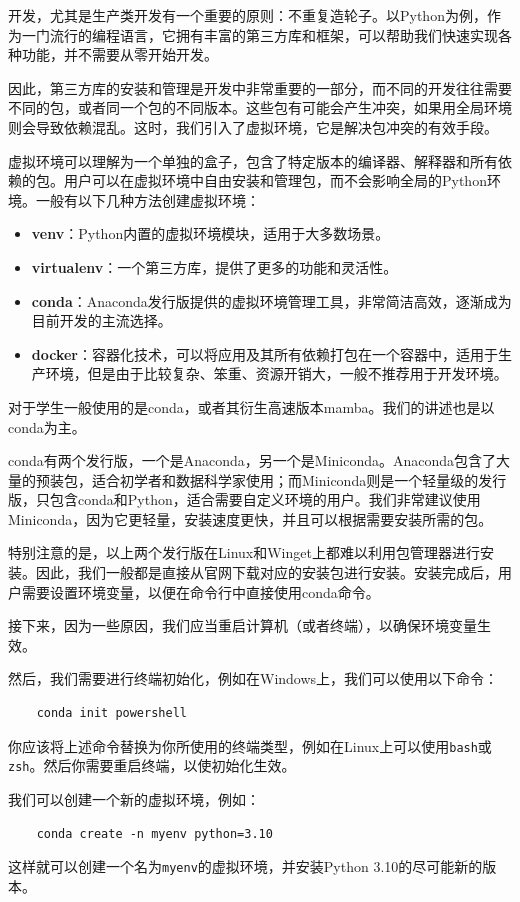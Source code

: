 \documentclass[../main.tex]{subfiles}
\begin{document}
开发，尤其是生产类开发有一个重要的原则：不重复造轮子。以Python为例，作为一门流行的编程语言，它拥有丰富的第三方库和框架，可以帮助我们快速实现各种功能，并不需要从零开始开发。

因此，第三方库的安装和管理是开发中非常重要的一部分，而不同的开发往往需要不同的包，或者同一个包的不同版本。这些包有可能会产生冲突，如果用全局环境则会导致依赖混乱。这时，我们引入了虚拟环境，它是解决包冲突的有效手段。

虚拟环境可以理解为一个单独的盒子，包含了特定版本的编译器、解释器和所有依赖的包。用户可以在虚拟环境中自由安装和管理包，而不会影响全局的Python环境。一般有以下几种方法创建虚拟环境：
\begin{itemize}
  \item \textbf{venv}：Python内置的虚拟环境模块，适用于大多数场景。
  \item \textbf{virtualenv}：一个第三方库，提供了更多的功能和灵活性。
  \item \textbf{conda}：Anaconda发行版提供的虚拟环境管理工具，非常简洁高效，逐渐成为目前开发的主流选择。
  \item \textbf{docker}：容器化技术，可以将应用及其所有依赖打包在一个容器中，适用于生产环境，但是由于比较复杂、笨重、资源开销大，一般不推荐用于开发环境。
\end{itemize}

对于学生一般使用的是conda，或者其衍生高速版本mamba。我们的讲述也是以conda为主。

conda有两个发行版，一个是Anaconda，另一个是Miniconda。Anaconda包含了大量的预装包，适合初学者和数据科学家使用；而Miniconda则是一个轻量级的发行版，只包含conda和Python，适合需要自定义环境的用户。我们非常建议使用Miniconda，因为它更轻量，安装速度更快，并且可以根据需要安装所需的包。

特别注意的是，以上两个发行版在Linux和Winget上都难以利用包管理器进行安装。因此，我们一般都是直接从官网下载对应的安装包进行安装。安装完成后，用户需要设置环境变量，以便在命令行中直接使用conda命令。

接下来，因为一些原因，我们应当重启计算机（或者终端），以确保环境变量生效。

然后，我们需要进行终端初始化，例如在Windows上，我们可以使用以下命令：
\begin{verbatim}
    conda init powershell
\end{verbatim}

你应该将上述命令替换为你所使用的终端类型，例如在Linux上可以使用\texttt{bash}或\texttt{zsh}。然后你需要重启终端，以使初始化生效。

我们可以创建一个新的虚拟环境，例如：
\begin{verbatim}
    conda create -n myenv python=3.10
\end{verbatim}
这样就可以创建一个名为\texttt{myenv}的虚拟环境，并安装Python 3.10的尽可能新的版本。
\end{document}
